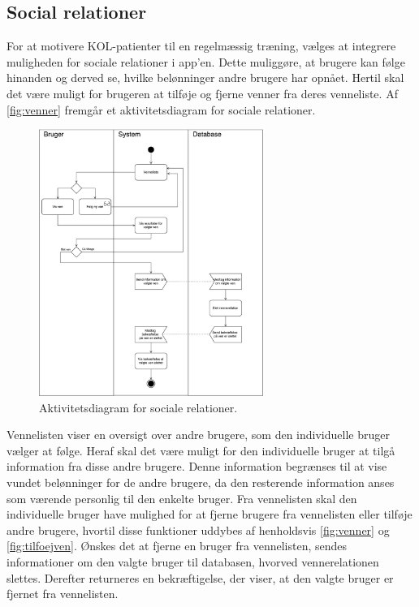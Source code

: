 \subsection{Social relationer} 
For at motivere KOL-patienter til en regelmæssig træning, vælges at integrere muligheden for sociale relationer i app'en. Dette muliggøre, at brugere kan følge hinanden og derved se, hvilke belønninger andre brugere har opnået. Hertil skal det være muligt for brugeren at tilføje og fjerne venner fra deres venneliste. 
Af \autoref{fig:venner} fremgår et aktivitetsdiagram for sociale relationer. 

\begin{figure} [H]
\centering
\includegraphics[width=0.65\textwidth]{figures/aktivitetsdiagram/venner}
\caption{Aktivitetsdiagram for sociale relationer.}
\label{fig:venner}
\end{figure}

\noindent
Vennelisten viser en oversigt over andre brugere, som den individuelle bruger vælger at følge. Heraf skal det være muligt for den individuelle bruger at tilgå information fra disse andre brugere. Denne information begrænses til at vise vundet belønninger for de andre brugere, da den resterende information anses som værende personlig til den enkelte bruger. 
Fra vennelisten skal den individuelle bruger have mulighed for at fjerne brugere fra vennelisten eller tilføje andre brugere, hvortil disse funktioner uddybes af henholdsvis \autoref{fig:venner} og \autoref{fig:tilfoejven}.  
Ønskes det at fjerne en bruger fra vennelisten, sendes informationer om den valgte bruger til databasen, hvorved vennerelationen slettes. Derefter returneres en bekræftigelse, der viser, at den valgte bruger er fjernet fra vennelisten. 

